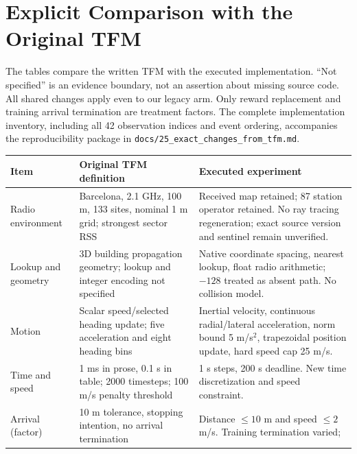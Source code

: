 \onecolumn
\appendices
\section{Explicit Comparison with the Original TFM}
\label{app:comparison}
The tables compare the written TFM with the executed implementation. ``Not
specified'' is an evidence boundary, not an assertion about missing source code.
All shared changes apply even to our legacy arm. Only reward replacement and
training arrival termination are treatment factors. The complete implementation
inventory, including all 42 observation indices and event ordering, accompanies
the reproducibility package in \texttt{docs/25\_exact\_changes\_from\_tfm.md}.

{\centering\footnotesize
{}
\label{tab:modelcomparison}
\begin{tabular}{@{}p{}p{}p{}@{}}
\toprule
Item & Original TFM definition & Executed experiment \\
\midrule
Radio environment & Barcelona, 2.1 GHz, 100 m, 133 sites, nominal 1 m grid;
strongest sector RSS~\cite[pp.~6--7, Sec.~3.1, Table~2]{thesis}
& Received map retained; 87 station operator retained. No ray tracing regeneration;
exact source version and sentinel remain unverified. \\
Lookup and geometry & 3D building propagation geometry; lookup and integer
encoding not specified~\cite[pp.~6--7, Sec.~3.1]{thesis}
& Native coordinate spacing, nearest lookup, float radio arithmetic; $-128$
treated as absent path. No collision model. \\
Motion & Scalar speed/selected heading update; five acceleration and eight
heading bins~\cite[p.~9, Eq.~(2); pp.~12, 15]{thesis}
& Inertial velocity, continuous radial/lateral acceleration, norm bound 5 m/s$^2$,
trapezoidal position update, hard speed cap 25 m/s. \\
Time and speed & 1 ms in prose, 0.1 s in table; 2000 timesteps; 100 m/s
penalty threshold~\cite[pp.~14--16, Tables~3--4]{thesis}
& 1 s steps, 200 s deadline. New time discretization and speed constraint. \\
Arrival (factor) & 10 m tolerance, stopping intention, no arrival termination
\cite[p.~9, Sec.~3.2; p.~12, Sec.~5.2; p.~15, Table~3]{thesis}
& Distance $\leq10$ m and speed $\leq2$ m/s. Training termination varied;

\end{tabular}}
